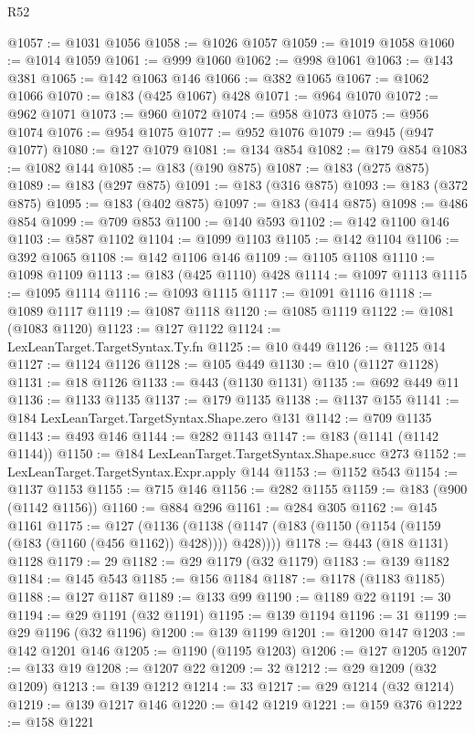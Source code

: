 \begin{lexlean}{R52}
\begin{coremodule}
@1057 := @1031 @1056
@1058 := @1026 @1057
@1059 := @1019 @1058
@1060 := @1014 @1059
@1061 := @999 @1060
@1062 := @998 @1061
@1063 := @143 @381
@1065 := @142 @1063 @146
@1066 := @382 @1065
@1067 := @1062 @1066
@1070 := @183 (@425 @1067) @428
@1071 := @964 @1070
@1072 := @962 @1071
@1073 := @960 @1072
@1074 := @958 @1073
@1075 := @956 @1074
@1076 := @954 @1075
@1077 := @952 @1076
@1079 := @945 (@947 @1077)
@1080 := @127 @1079
@1081 := @134 @854
@1082 := @179 @854
@1083 := @1082 @144
@1085 := @183 (@190 @875)
@1087 := @183 (@275 @875)
@1089 := @183 (@297 @875)
@1091 := @183 (@316 @875)
@1093 := @183 (@372 @875)
@1095 := @183 (@402 @875)
@1097 := @183 (@414 @875)
@1098 := @486 @854
@1099 := @709 @853
@1100 := @140 @593
@1102 := @142 @1100 @146
@1103 := @587 @1102
@1104 := @1099 @1103
@1105 := @142 @1104
@1106 := @392 @1065
@1108 := @142 @1106 @146
@1109 := @1105 @1108
@1110 := @1098 @1109
@1113 := @183 (@425 @1110) @428
@1114 := @1097 @1113
@1115 := @1095 @1114
@1116 := @1093 @1115
@1117 := @1091 @1116
@1118 := @1089 @1117
@1119 := @1087 @1118
@1120 := @1085 @1119
@1122 := @1081 (@1083 @1120)
@1123 := @127 @1122
@1124 := LexLeanTarget.TargetSyntax.Ty.fn
@1125 := @10 @449
@1126 := @1125 @14
@1127 := @1124 @1126
@1128 := @105 @449
@1130 := @10 (@1127 @1128)
@1131 := @18 @1126
@1133 := @443 (@1130 @1131)
@1135 := @692 @449 @11
@1136 := @1133 @1135
@1137 := @179 @1135
@1138 := @1137 @155
@1141 := @184 LexLeanTarget.TargetSyntax.Shape.zero @131
@1142 := @709 @1135
@1143 := @493 @146
@1144 := @282 @1143
@1147 := @183 (@1141 (@1142 @1144))
@1150 := @184 LexLeanTarget.TargetSyntax.Shape.succ @273
@1152 := LexLeanTarget.TargetSyntax.Expr.apply @144
@1153 := @1152 @543
@1154 := @1137 @1153
@1155 := @715 @146
@1156 := @282 @1155
@1159 := @183 (@900 (@1142 @1156))
@1160 := @884 @296
@1161 := @284 @305
@1162 := @145 @1161
@1175 := @127
    (@1136 (@1138 (@1147 (@183 (@1150 (@1154 (@1159 (@183 (@1160 (@456 @1162)) @428)))) @428))))
@1178 := @443 (@18 @1131) @1128
@1179 := 29
@1182 := @29 @1179 (@32 @1179)
@1183 := @139 @1182
@1184 := @145 @543
@1185 := @156 @1184
@1187 := @1178 (@1183 @1185)
@1188 := @127 @1187
@1189 := @133 @99
@1190 := @1189 @22
@1191 := 30
@1194 := @29 @1191 (@32 @1191)
@1195 := @139 @1194
@1196 := 31
@1199 := @29 @1196 (@32 @1196)
@1200 := @139 @1199
@1201 := @1200 @147
@1203 := @142 @1201 @146
@1205 := @1190 (@1195 @1203)
@1206 := @127 @1205
@1207 := @133 @19
@1208 := @1207 @22
@1209 := 32
@1212 := @29 @1209 (@32 @1209)
@1213 := @139 @1212
@1214 := 33
@1217 := @29 @1214 (@32 @1214)
@1219 := @139 @1217 @146
@1220 := @142 @1219
@1221 := @159 @376
@1222 := @158 @1221

\end{coremodule}
\end{lexlean}
